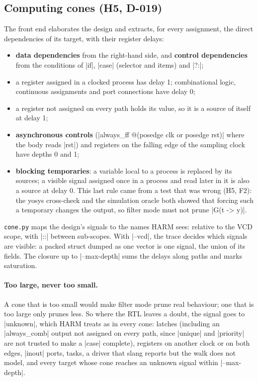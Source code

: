 \subsection{Computing cones (H5, D-019)}
The front end elaborates the design and extracts, for every assignment, the direct dependencies of its target, with their register delays:
\begin{itemize}
\item \textbf{data dependencies} from the right-hand side, and \textbf{control dependencies} from the conditions of \code|if|, \code|case| (selector and items) and \code|?:|;
\item a register assigned in a clocked process has delay 1; combinational logic, continuous assignments and port connections have delay 0;
\item a register not assigned on every path holds its value, so it is a source of itself at delay 1;
\item \textbf{asynchronous controls} (\code|always_ff @(posedge clk or posedge rst)| where the body reads \code|rst|) and registers on the falling edge of the sampling clock have depths 0 and 1;
\item \textbf{blocking temporaries}: a variable local to a process is replaced by its sources; a visible signal assigned once in a process and read later in it is also a source at delay 0. This last rule came from a test that was wrong (H5, F2): the yosys cross-check and the simulation oracle both showed that forcing such a temporary changes the output, so filter mode must not prune \code|G(t -> y)|.
\end{itemize}
\texttt{cone.py} maps the design's signals to the names HARM sees: relative to the VCD scope, with \code|::| between sub-scopes. With \code|--vcd|, the trace decides which signals are visible: a packed struct dumped as one vector is one signal, the union of its fields. The closure up to \code|--max-depth| sums the delays along paths and marks saturation.

\paragraph{Too large, never too small.} A cone that is too small would make filter mode prune real behaviour; one that is too large only prunes less. So where the RTL leaves a doubt, the signal goes to \code|unknown|, which HARM treats as in every cone: latches (including an \code|always_comb| output not assigned on every path, since \code|unique| and \code|priority| are not trusted to make a \code|case| complete), registers on another clock or on both edges, \code|inout| ports, tasks, a driver that slang reports but the walk does not model, and every target whose cone reaches an unknown signal within \code|--max-depth|.


